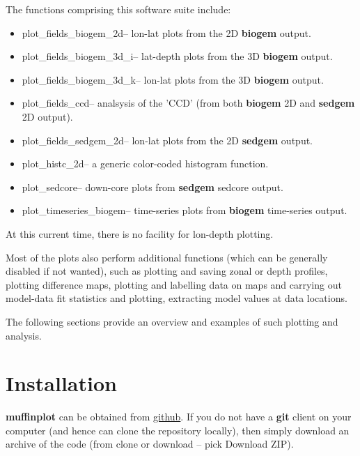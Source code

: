 \documentclass[11pt,fleqn]{book} %
\begin{document}
The functions comprising this software suite include:

\begin{itemize}[noitemsep]
\item \footnotesize\textsf{plot\_fields\_biogem\_2d}\normalsize -- lon-lat plots from the 2D \textbf{biogem} output.
\item \footnotesize\textsf{plot\_fields\_biogem\_3d\_i}\normalsize -- lat-depth plots from the 3D \textbf{biogem} output. 
\item \footnotesize\textsf{plot\_fields\_biogem\_3d\_k}\normalsize -- lon-lat plots from the 3D \textbf{biogem} output.
\item \footnotesize\textsf{plot\_fields\_ccd}\normalsize -- analsysis of the 'CCD' (from both \textbf{biogem} 2D and \textbf{sedgem} 2D output).
\item \footnotesize\textsf{plot\_fields\_sedgem\_2d}\normalsize -- lon-lat plots from the 2D \textbf{sedgem} output.
\item \footnotesize\textsf{plot\_histc\_2d}\normalsize -- a generic color-coded histogram function.
\item \footnotesize\textsf{plot\_sedcore}\normalsize -- down-core plots from \textbf{sedgem} sedcore output.
\item \footnotesize\textsf{plot\_timeseries\_biogem}\normalsize -- time-series plots from \textbf{biogem} time-series output.
\end{itemize}

At this current time, there is no facility for lon-depth plotting.

Most of the plots also perform additional functions (which can be generally disabled if not wanted), such as plotting and saving zonal or depth profiles, plotting difference maps, plotting and labelling data on maps and carrying out model-data fit statistics and plotting, extracting model values at data locations.

The following sections provide an overview and examples of such plotting and analysis.


\section{Installation}

\textbf{muffinplot} can be obtained from \href{https://github.com/derpycode/muffinplot\#https://github.com/derpycode/muffinplot}{github}. If you do not have a \textbf{git} client on your computer (and hence can clone the repository locally), then simply download an archive of the code (from \footnotesize\textsf{\textcolor[rgb]{0,0.501961,0}{clone or download }}\normalsize -- pick \textsf{\footnotesize Download ZIP}).
\end{document}
